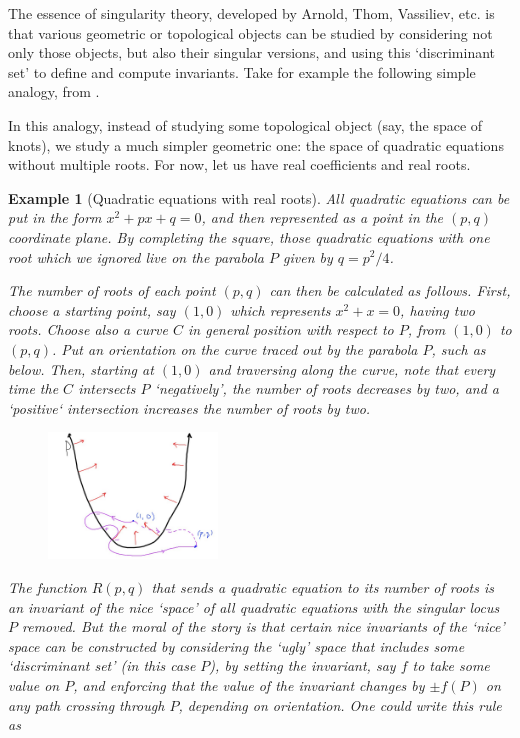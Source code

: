 \documentclass[12pt]{report}
\theoremstyle{regular}
\numberwithin{clause}{chapter}
\newtheorem{example}[clause]{Example}
\begin{document}
        The essence of singularity theory, developed by Arnold, Thom, Vassiliev, etc. is that various geometric or topological objects can be studied by considering not only those objects, but also their singular versions, and using this `discriminant set' to define and compute invariants. Take for example the following simple analogy, from \cite{knots-links-and-their-invariants}.

        In this analogy, instead of studying some topological object (say, the space of knots), we study a much simpler geometric one: the space of quadratic equations without multiple roots. For now, let us have real coefficients and real roots.

        \begin{example}[Quadratic equations with real roots]
                All quadratic equations can be put in the form \(x^{2} + px + q = 0\), and then represented as a point in the \((p, q)\) coordinate plane. By completing the square, those quadratic equations with one root which we ignored live on the parabola \(P\) given by \(q = p^{2}/4\).

                The number of roots of each point \((p, q)\) can then be calculated as follows. First, choose a starting point, say \((1, 0)\) which represents \(x^{2} + x = 0\), having two roots. Choose also a curve \(C\) in general position with respect to \(P\), from \((1, 0)\) to \((p, q)\). Put an orientation on the curve traced out by the parabola \(P\), such as below. Then, starting at \((1, 0)\) and traversing along the curve, note that every time the \(C\) intersects \(P\) `negatively', the number of roots decreases by two, and a `positive` intersection increases the number of roots by two.

                \begin{figure}[H]
                        \centering
                        \includegraphics[width=0.4\textwidth]{graphics/parabola_example.jpg}
                \end{figure}

                The function \(R(p, q)\) that sends a quadratic equation to its number of roots is an invariant of the nice `space' of all quadratic equations with the singular locus \(P\) removed. But the moral of the story is that certain nice invariants of the `nice' space can be constructed by considering the `ugly' space that includes some `discriminant set' (in this case \(P\)), by setting the invariant, say \(f\) to take some value on \(P\), and enforcing that the value of the invariant changes by \(\pm f(P)\) on any path crossing through \(P\), depending on orientation. One could write this rule as


\end{example}
\end{document}
